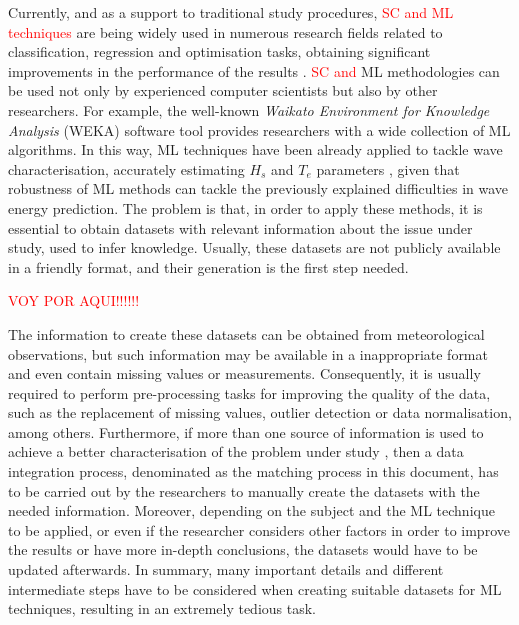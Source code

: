 \documentclass[energies,article,submit,moreauthors,pdftex]{Definitions/mdpi}
\begin{document}
		
		Currently, and as a support to traditional study procedures, \textcolor{red}{SC and ML techniques} \textcolor{red}{\cite{Sang-Yong2014,Bishop:2006:PRM:1162264}} are being widely used in numerous research fields related to classification, regression and optimisation tasks, obtaining significant improvements in the performance of the results \textcolor{red}{\cite{Fi-John2019,Mosavi2019,GUO201816}}. \textcolor{red}{SC and} ML methodologies can be used not only by experienced computer scientists but also by other researchers. For example, the well-known \textit{Waikato Environment for Knowledge Analysis} (WEKA) \cite{WEKA} software tool provides researchers with a wide collection of ML  algorithms. In this way, ML techniques have been already applied to tackle wave characterisation, accurately estimating $H_{s}$ and $T_{e}$ parameters \cite{DURANROSAL2017268, KUMAR2017605}, given that robustness of ML methods can tackle the previously explained difficulties in wave energy prediction. The problem is that, in order to apply these methods, it is essential to obtain datasets with relevant information about the issue under study, used to infer knowledge. Usually, these datasets are not publicly available in a friendly format, and their generation is the first step needed.
		
		\textcolor{red}{VOY POR AQUI!!!!!!}

		The information to create these datasets can be obtained from meteorological observations, but such information may be available in a inappropriate format and even contain missing values or measurements. Consequently, it is usually required to perform pre-processing tasks for improving the quality of the data, such as the replacement of missing values, outlier detection or data normalisation, among others. Furthermore, if more than one source of information is used to achieve a better characterisation of the problem under study \cite{JOHANSSON2015143, FERNANDEZ201544, Adams2010}, then a data integration process, denominated as the matching process in this document, has to be carried out by the researchers to manually create the datasets with the needed information. Moreover, depending on the subject and the ML technique to be applied, or even if the researcher considers other factors in order to improve the results or have more in-depth conclusions, the datasets would have to be updated afterwards. In summary, many important details and different intermediate steps have to be considered when creating suitable datasets for ML techniques, resulting in an extremely tedious task.
\end{document}
